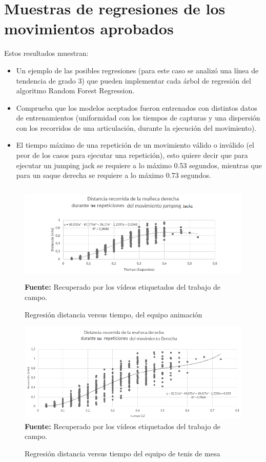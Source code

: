 \section{Muestras de regresiones de los movimientos aprobados} \label{res:regretions}
Estos resultados muestran:
\begin{itemize}
\item  Un ejemplo de las posibles regresiones (para este caso se analiz\'o una l\'inea de tendencia de grado 3) que pueden implementar cada \'arbol de regresi\'on del algoritmo Random Forest Regression.
\item  Comprueba que los modelos aceptados fueron entrenados con distintos datos de entrenamientos (uniformidad con los tiempos de capturas y una dispersi\'on con los recorridos de una articulaci\'on, durante la ejecuci\'on del  movimiento).
\item  El tiempo m\'aximo de una repetici\'on de un movimiento v\'alido o inv\'alido (el peor de los casos para ejecutar una repetici\'on), esto quiere  decir que para ejecutar un jumping jack se requiere a lo m\'aximo 0.53 segundos, mientras que para un saque derecha se requiere a lo m\'aximo 0.73 segundos.
\end{itemize}

\begin{figure}[H]
	\caption{Regresi\'on distancia versus tiempo, del equipo animaci\'on}
	\label{fig:regrCheerleader}
	\centering
	\includegraphics[width=445px,height=180px]{graphics/resultados/cluster-cheerleaders.PNG} \\
	\textbf{Fuente:} Recuperado por los v\'ideos etiquetados del trabajo de campo.
\end{figure}
\begin{figure}[H]
	\caption{Regresi\'on distancia versus tiempo  del equipo de tenis de mesa}
	\label{fig:regrTennisDeMesa}
	\centering
	\includegraphics[width=445px,height=180px]{graphics/resultados/cluster-tennis.PNG} \\
	\textbf{Fuente:} Recuperado por los v\'ideos etiquetados del trabajo de campo.
\end{figure}
